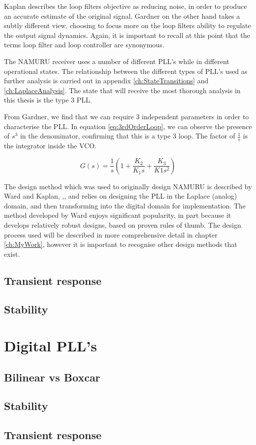 	Kaplan describes the loop filters objective as reducing noise, in order to produce an accurate estimate of the original signal\cite{Kaplan}. Gardner on the other hand takes a subtly different view, choosing to focus more on the loop filters ability to regulate the output signal dynamics\cite{Gardner}. Again, it is important to recall at this point that the terms loop filter and loop controller are synonymous. 
	
	
	The \ac{NAMURU} receiver uses a number of different PLL's while in different operational states. The relationship between the different types of PLL's used as further analysis is carried out in appendix \ref{ch:StateTransitions} and \ref{ch:LaplaceAnalysis}. The state that will receive the most thorough analysis in this thesis is the type 3 PLL. 
	
	
	From Gardner, we find that we can require 3 independent parameters in order to characterise the PLL\cite{Gardner}. In equation \ref{eq:3rdOrderLoop}, we can observe the presence of $s^3$ in the denominator, confirming that this is a type 3 loop. The factor of $\frac{1}{s}$ is the integrator inside the \ac{VCO}.
	
	
	\begin{equation}
	G(s) = \frac{1}{s}(1 + \frac{K_2}{K_1s} + \frac{K_3}{K1s^2})
	\label{eq:3rdOrderLoop}
	\end{equation}
	
	
	The design method which was used to originally design \ac{NAMURU} is described by Ward and Kaplan, \cite{Ward},\cite{Kaplan}, and relies on designing the PLL in the Laplace (analog) domain, and then transforming into the digital domain for implementation. The method developed by Ward enjoys significant popularity, in part because it develops relatively robust designs, based on proven rules of thumb. The design process used will be described in more comprehensive detail in chapter \ref{ch:MyWork}, however it is important to recognise other design methods that exist. 
	
	\subsection{Transient response}
	
	\subsection{Stability}

\clearpage

\section{Digital PLL's}
	\subsection{Bilinear vs Boxcar}
	\subsection{Stability}
	\subsection{Transient response}
